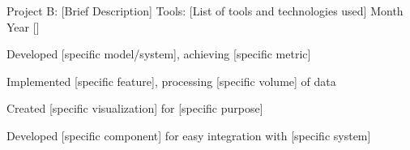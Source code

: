 \resumeProject
  {Project B: [Brief Description]}
  {Tools: [List of tools and technologies used]}
  {Month Year}
  {{}[\href{https://github.com/your-username/project-b}{\textcolor{darkblue}{\faGithub}}]}
\resumeItemListStart
  \item Developed [specific model/system], achieving [specific metric]
  \item Implemented [specific feature], processing [specific volume] of data
  \item Created [specific visualization] for [specific purpose]
  \item Developed [specific component] for easy integration with [specific system]
\resumeItemListEnd

\resumeSubHeadingListEnd
